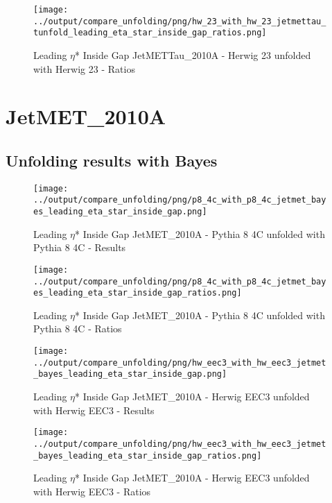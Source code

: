 \documentclass[11pt]{book}
\begin{document}
\begin{figure}[ht]
\centering
\texttt{[image: ../output/compare\_unfolding/png/hw\_23\_with\_hw\_23\_jetmettau\_tunfold\_leading\_eta\_star\_inside\_gap\_ratios.png]}
\caption{Leading $\eta$* Inside Gap JetMETTau\_2010A - Herwig 23 unfolded with Herwig 23 - Ratios}
\label{hw_23_hw_23_jetmettau_tunfold_leading_eta_star_inside_gap_b}
\end{figure}


\clearpage
\section{JetMET\_2010A}
\subsection{Unfolding results with Bayes}

\begin{figure}[ht]
\centering
\texttt{[image: ../output/compare\_unfolding/png/p8\_4c\_with\_p8\_4c\_jetmet\_bayes\_leading\_eta\_star\_inside\_gap.png]}
\caption{Leading $\eta$* Inside Gap JetMET\_2010A - Pythia 8 4C unfolded with Pythia 8 4C - Results}
\label{p8_p8_jetmet_bayes_leading_eta_star_inside_gap_a}
\end{figure}

\begin{figure}[ht]
\centering
\texttt{[image: ../output/compare\_unfolding/png/p8\_4c\_with\_p8\_4c\_jetmet\_bayes\_leading\_eta\_star\_inside\_gap\_ratios.png]}
\caption{Leading $\eta$* Inside Gap JetMET\_2010A - Pythia 8 4C unfolded with Pythia 8 4C - Ratios}
\label{p8_p8_jetmet_bayes_leading_eta_star_inside_gap_b}
\end{figure}

\begin{figure}[ht]
\centering
\texttt{[image: ../output/compare\_unfolding/png/hw\_eec3\_with\_hw\_eec3\_jetmet\_bayes\_leading\_eta\_star\_inside\_gap.png]}
\caption{Leading $\eta$* Inside Gap JetMET\_2010A - Herwig EEC3 unfolded with Herwig EEC3 - Results}
\label{hw_eec3_hw_eec3_jetmet_bayes_leading_eta_star_inside_gap_a}
\end{figure}

\begin{figure}[ht]
\centering
\texttt{[image: ../output/compare\_unfolding/png/hw\_eec3\_with\_hw\_eec3\_jetmet\_bayes\_leading\_eta\_star\_inside\_gap\_ratios.png]}
\caption{Leading $\eta$* Inside Gap JetMET\_2010A - Herwig EEC3 unfolded with Herwig EEC3 - Ratios}
\label{hw_eec3_hw_eec3_jetmet_bayes_leading_eta_star_inside_gap_b}
\end{figure}
\end{document}
